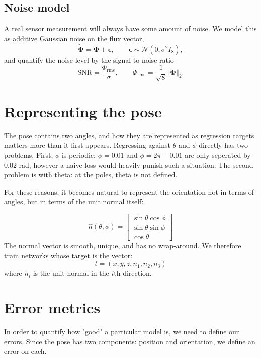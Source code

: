 \documentclass[12pt,a4paper]{report}
\begin{document}
\subsection{Noise model}
A real sensor measurement will always have some amount of noise. We model this as additive Gaussian noise on the flux vector, 
\begin{equation}
  \tilde{\mathbf{\Phi}} = \mathbf{\Phi} + \mathbf{\epsilon},
  \qquad \mathbf{\epsilon} \sim \mathcal{N}(0, \sigma^2 I_8),
\end{equation}
and quantify the noise level by the signal-to-noise ratio
\begin{equation}
  \label{eq:snr}
  \text{SNR} = \frac{\Phi_{\text{rms}}}{\sigma},
  \qquad
  \Phi_{\text{rms}} = \frac{1}{\sqrt{8}}\left\Vert \mathbf{\Phi} \right\Vert_2 .
\end{equation}

\section{Representing the pose}\label{sec:representation}
The pose contains two angles, and how they are represented as regression targets matters more than it first appears. Regressing against $\theta$ and $\phi$ directly has two problems. First, $\phi$ is periodic: $\phi = 0.01$ and $\phi = 2\pi - 0.01$ are only seperated by $0.02$ rad, however a naive loss would heavily punish such a situation. The second problem is with theta: at the poles, theta is not defined.

For these reasons, it becomes natural to represent the orientation not in terms of angles, but in terms of the unit normal itself:

\begin{equation}
  \hat{n}(\theta,\phi) = \begin{bmatrix} \sin\theta\cos\phi \\ \sin\theta\sin\phi \\ \cos\theta \end{bmatrix}
\end{equation}
The normal vector is smooth, unique, and has no wrap-around. We therefore train networks whose target is the vector:
\begin{equation}
  t = (x,y,z,n_1,n_2,n_3)
\end{equation}
where $n_i$ is the unit normal in the $i$th direction.

\section{Error metrics}\label{sec:error}
In order to quantify how "good" a particular model is, we need to define our errors. Since the pose has two components: position and orientation, we define an error on each. 
\end{document}
